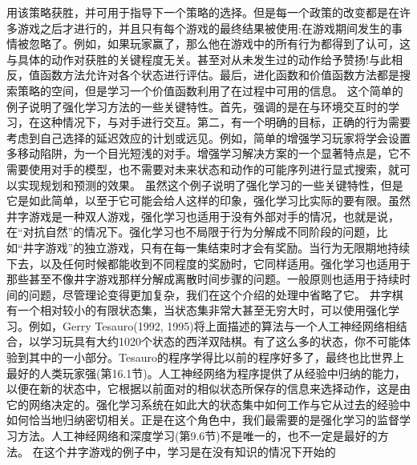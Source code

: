 用该策略获胜，并可用于指导下一个策略的选择。但是每一个政策的改变都是在许多游戏之后才进行的，并且只有每个游戏的最终结果被使用:在游戏期间发生的事情被忽略了。例如，如果玩家赢了，那么他在游戏中的所有行为都得到了认可，这与具体的动作对获胜的关键程度无关。甚至对从未发生过的动作给予赞扬!与此相反，值函数方法允许对各个状态进行评估。最后，进化函数和价值函数方法都是搜索策略的空间，但是学习一个价值函数利用了在过程中可用的信息。
这个简单的例子说明了强化学习方法的一些关键特性。首先，强调的是在与环境交互时的学习，在这种情况下，与对手进行交互。第二，有一个明确的目标，正确的行为需要考虑到自己选择的延迟效应的计划或远见。例如，简单的增强学习玩家将学会设置多移动陷阱，为一个目光短浅的对手。增强学习解决方案的一个显著特点是，它不需要使用对手的模型，也不需要对未来状态和动作的可能序列进行显式搜索，就可以实现规划和预测的效果。
虽然这个例子说明了强化学习的一些关键特性，但是它是如此简单，以至于它可能会给人这样的印象，强化学习比实际的要有限。虽然井字游戏是一种双人游戏，强化学习也适用于没有外部对手的情况，也就是说，在“对抗自然”的情况下。强化学习也不局限于行为分解成不同阶段的问题，比如“井字游戏”的独立游戏，只有在每一集结束时才会有奖励。当行为无限期地持续下去，以及任何时候都能收到不同程度的奖励时，它同样适用。强化学习也适用于那些甚至不像井字游戏那样分解成离散时间步骤的问题。一般原则也适用于持续时间的问题，尽管理论变得更加复杂，我们在这个介绍的处理中省略了它。
井字棋有一个相对较小的有限状态集，当状态集非常大甚至无穷大时，可以使用强化学习。例如，Gerry Tesauro(1992, 1995)将上面描述的算法与一个人工神经网络相结合，以学习玩具有大约1020个状态的西洋双陆棋。有了这么多的状态，你不可能体验到其中的一小部分。Tesauro的程序学得比以前的程序好多了，最终也比世界上最好的人类玩家强(第16.1节)。人工神经网络为程序提供了从经验中归纳的能力，以便在新的状态中，它根据以前面对的相似状态所保存的信息来选择动作，这是由它的网络决定的。强化学习系统在如此大的状态集中如何工作与它从过去的经验中如何恰当地归纳密切相关。正是在这个角色中，我们最需要的是强化学习的监督学习方法。人工神经网络和深度学习(第9.6节)不是唯一的，也不一定是最好的方法。
在这个井字游戏的例子中，学习是在没有知识的情况下开始的

